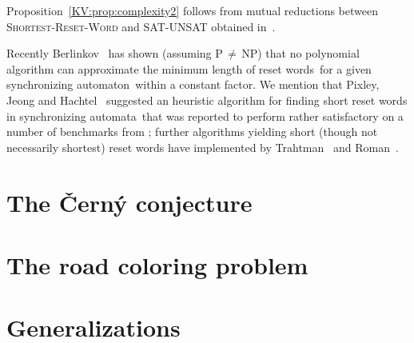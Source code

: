 \documentclass{irmaart}
\newcommand{\sa}{synchronizing au\-tom\-a\-ta}
\newcommand{\san}{synchronizing au\-tom\-a\-ton}
\newcommand{\sws}{reset words}
\begin{document}
Proposition~\ref{KV:prop:complexity2} follows from mutual
reductions between \textsc{Shortest-Reset-Word} and
\textsc{SAT-UNSAT} obtained in~\cite{Gawrychowski:2008}.

Recently  Berlinkov~\cite{Berlinkov:2010} has shown (assuming
\textsf{P}\,$\ne$\,\textsf{NP}) that no polynomial algorithm can
approximate the minimum length of \sws\ for a given \san\ within a
constant factor. We mention that Pixley, Jeong and
Hachtel~\cite{Pixley&Jeong&Hachtel:1992} suggested an heuristic
algorithm for finding short reset words in \sa\ that was reported
to perform rather satisfactory on a number of benchmarks from
\cite{Yang:1991}; further algorithms yielding short (though not
necessarily shortest) reset words have implemented by
Trahtman~\cite{Trahtman:2006} and Roman~\cite{Roman:2009}.

\section{The \v{C}ern\'{y} conjecture}

\section{The road coloring problem}

\section{Generalizations}


\begin{footnotesize}
  
\end{footnotesize}


\markright{\indexname}\markboth{\indexname}{\indexname}
\printindex
\end{document}
